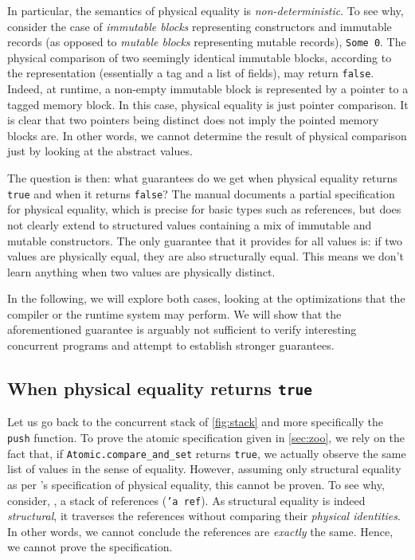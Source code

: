 In particular, the semantics of physical equality is \emph{non-deterministic}.
To see why, consider the case of \emph{immutable blocks} representing constructors and immutable records (as opposed to \emph{mutable blocks} representing mutable records), \eg \texttt{Some 0}.
The physical comparison of two seemingly identical immutable blocks, according to the \Rocq representation (essentially a tag and a list of fields), may return \texttt{false}.
Indeed, at runtime, a non-empty immutable block is represented by a pointer to a tagged memory block.
In this case, physical equality is just pointer comparison.
It is clear that two pointers being distinct does not imply the pointed memory blocks are.
In other words, we cannot determine the result of physical comparison just by looking at the abstract values.

The question is then: what guarantees do we get when physical equality returns \texttt{true} and when it returns \texttt{false}?
The \OCaml manual documents a partial specification for physical equality, which is precise for basic types such as references, but does not clearly extend to structured values containing a mix of immutable and mutable constructors.
The only guarantee that it provides for all values is: if two values are physically equal, they are also structurally equal.
This means we don't learn anything when two values are physically distinct.

In the following, we will explore both cases, looking at the optimizations that the compiler or the runtime system may perform.
We will show that the aforementioned guarantee is arguably not sufficient to verify interesting concurrent programs and attempt to establish stronger guarantees.

\subsection{When physical equality returns \texttt{true}}

Let us go back to the concurrent stack of \cref{fig:stack} and more specifically the \texttt{push} function.
To prove the atomic specification given in \cref{sec:zoo}, we rely on the fact that, if \texttt{Atomic.compare_and_set} returns \texttt{true}, we actually observe the same list of values in the sense of \Rocq equality.
However, assuming only structural equality as per \OCaml's specification of physical equality, this cannot be proven.
To see why, consider, \eg, a stack of references (\texttt{'a ref}).
As structural equality is indeed \emph{structural}, it traverses the references without comparing their \emph{physical identities}.
In other words, we cannot conclude the references are \emph{exactly} the same.
Hence, we cannot prove the specification.


